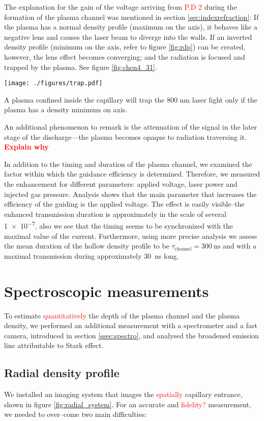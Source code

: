 \documentclass[nofonts]{tufte-book}
\begin{document}
The explanation for the gain of the voltage arriving from \textcolor{red}{P.D 2} during the formation of the plasma channel was mentioned in section \ref{sec:indexrefraction}: If the plasma has a normal density profile (maximum on the axis), it behaves like a negative lens and causes the laser beam to diverge into the walls. If an inverted density profile (minimum on the axis, refer to figure \ref{fig:rdp}) can be created, however, the lens effect becomes converging; and the radiation is focused and trapped by the plasma. See figure \ref{fig:chen4_31}.
\begin{marginfigure}
		\texttt{[image: ./figures/trap.pdf]}
		\caption{A plasma confined inside the capillary will trap the 800 nm laser light only if the plasma has a density minimum on axis.}
		\label{fig:chen4_31}
\end{marginfigure}

An additional phenomenon to remark is the attenuation of the signal in the later stage of the discharge---the plasma becomes opaque to radiation traversing it. \textcolor{red}{\textbf{Explain why}}

In addition to the timing and duration of the plasma channel, we examined the factor within which the guidance efficiency is determined. Therefore, we measured the enhancement for different parameters: applied voltage, laser power and injected gas pressure. Analysis shows that the main parameter that increases the efficiency of the guiding is the applied voltage. The effect is easily visible--the enhanced transmission duration is approximately in the scale of several \SI{1e-7}{\sec}, also we see that the timing seems to be synchronized with the maximal value of the current. Furthermore, using more precise analysis we assess the mean duration of the hollow density profile to be $\tau_\text{channel}=\SI{300}{\ns}$ and with a maximal transmission during approximately \SI{30}{\ns} long.

\section{Spectroscopic measurements}\label{sec:spectro}
To estimate \textcolor{red}{quantitatively} the depth of the plasma channel and the plasma density, we performed an additional measurement with a spectrometer and a fast camera, introduced in section \ref{ssec:spectro}, and analysed the broadened emission line attributable to Stark effect.

\subsection{Radial density profile}\label{ssec:radial}
We installed an imaging system that images the \textcolor{red}{spatially} capillary entrance, shown in figure \ref{fig:radial_system}. For an accurate and \textcolor{red}{fidelity?} measurement, we needed to over--come two main difficulties:
\end{document}
